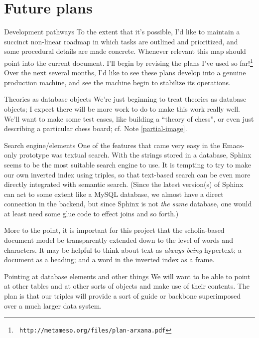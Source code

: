 \section{Future plans}

\begin{notate}{Development pathways}
To the extent that it's possible, I'd like to maintain a
succinct non-linear roadmap in which tasks are outlined
and prioritized, and some procedural details are made
concrete.  Whenever relevant this map should point into
the current document.  I'll begin by revising the plans
I've used so far!\footnote{{\tt
    http://metameso.org/files/plan-arxana.pdf}} Over the
next several months, I'd like to see these plans develop
into a genuine production machine, and see the machine
begin to stabilize its operations.
\end{notate}

\begin{notate}{Theories as database objects} \label{theories-as-database-objects}
We're just beginning to treat theories as database
objects; I expect there will be more work to do to make
this work really well.  We'll want to make some test
cases, like building a ``theory of chess'', or even just
describing a particular chess board; cf. Note
\ref{partial-image}.
\end{notate}

\begin{notate}{Search engine/elements} \label{search-engine}
One of the features that came very easy in the Emacs-only
prototype was textual search.  With the strings stored in
a database, Sphinx seems to be the most suitable search
engine to use.  It is tempting to try to make our own
inverted index using triples, so that text-based search
can be even more directly integrated with semantic search.
(Since the latest version(s) of Sphinx can act to some
extent like a MySQL database, we almost have a direct
connection in the backend, but since Sphinx is not
\emph{the same} database, one would at least need some
glue code to effect joins and so forth.)

More to the point, it is important for this project that
the scholia-based document model be transparently extended
down to the level of words and characters.  It may be
helpful to think about text as \emph{always being}
hypertext; a document as a heading; and a word in the
inverted index as a frame.
\end{notate}

\begin{notate}{Pointing at database elements and other things} \label{pointing}
We will want to be able to point at other tables and at
other sorts of objects and make use of their contents.
The plan is that our triples will provide a sort of guide
or backbone superimposed over a much larger data system.
\end{notate}

